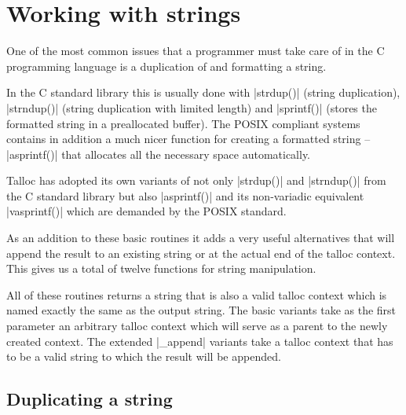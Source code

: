 \section{Working with strings}
\label{talloc:sec:strings}

One of the most common issues that a programmer must take care of in the C
programming language is a duplication of and formatting a string.

In the C standard library this is usually done with |strdup()| (string
duplication), |strndup()| (string duplication with limited length) and
|sprintf()| (stores the formatted string in a preallocated buffer). The POSIX
compliant systems contains in addition a much nicer function for creating a
formatted string -- |asprintf()| that allocates all the necessary space
automatically.

Talloc has adopted its own variants of not only |strdup()| and |strndup()| from
the C standard library but also |asprintf()| and its non-variadic
equivalent |vasprintf()| which are demanded by the POSIX standard.

As an addition to these basic routines it adds a very useful alternatives that
will append the result to an existing string or at the actual end of the talloc
context. This gives us a total of twelve functions for string manipulation.

All of these routines returns a string that is also a valid talloc context
which is named exactly the same as the output string. The basic variants take as
the first parameter an arbitrary talloc context which will serve as a parent to
the newly created context. The extended |_append| variants take a talloc context
that has to be a valid string to which the result will be appended.

\subsection{Duplicating a string}

